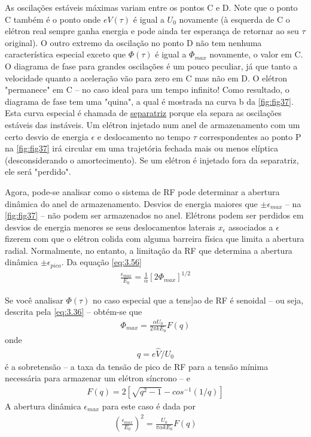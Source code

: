 As oscilações estáveis máximas variam entre os pontos C e D. Note que o ponto C também é o ponto onde $eV(\tau)$ é igual a $U_0$ novamente (à esquerda de C o elétron real sempre ganha energia e pode ainda ter esperança de retornar ao seu $\tau$ original). O outro extremo da oscilação no ponto D não tem nenhuma característica especial exceto que $\Phi(\tau)$ é igual a $\Phi_{max}$ novamente, o valor em C. O diagrama de fase para grandes oscilações é um pouco peculiar, já que tanto a velocidade quanto a aceleração vão para zero em C mas não em D. O elétron "permanece" em C -- no caso ideal para um tempo infinito! Como resultado, o diagrama de fase tem uma "quina", a qual é mostrada na curva b da \autoref{fig:fig37}. Esta curva especial é chamada de \uline{separatriz} porque ela separa as oscilações estáveis das instáveis. Um elétron injetado num anel de armazenamento com um certo desvio de energia $\epsilon$ e deslocamento no tempo $\tau$ correspondentes ao ponto P na \autoref{fig:fig37} irá circular em uma trajetória fechada mais ou menos elíptica (desconsiderando o amortecimento). Se um elétron é injetado fora da separatriz, ele será "perdido".

Agora, pode-se analisar como o sistema de RF pode determinar a abertura dinâmica do anel de armazenamento. Desvios de energia maiores que $\pm \epsilon_{max}$ -- na \autoref{fig:fig37} -- não podem ser armazenados no anel. Elétrons podem ser perdidos em desvios de energia menores se seus deslocamentos laterais $x_\epsilon$ associados a $\epsilon$ fizerem com que o elétron colida com alguma barreira física que limita a abertura radial. Normalmente, no entanto, a limitação da RF que determina a abertura dinâmica $\pm \epsilon_{pico}$. Da equação \eqref{eq:3.56}
\begin{align}
	\frac{\epsilon_{max}}{E_0} = \frac{1}{\alpha}[2\Phi_{max}]^{1/2}
\end{align}

Se você analisar $\Phi(\tau)$ no caso especial que a tens]ao de RF é senoidal -- ou seja, descrita pela \eqref{eq:3.36} -- obtém-se que
\begin{align}
	\Phi_{max} = \frac{\alpha U_0}{2\pi k E_0} F(q)
\end{align}
onde
\begin{align}
	q = e\widehat{V}/U_0
\end{align}
é a sobretensão -- a taxa da tensão de pico de RF para a tensão mínima necessária para armazenar um elétron síncrono -- e
\begin{align}
	F(q) = 2\left[\sqrt{q^2 - 1} - cos^{-1}(1/q)\right]
\end{align}
A abertura dinâmica $\epsilon_{max}$ para este caso é dada por
\begin{align}
	\left(\frac{\epsilon_{max}}{E_0}\right)^2 = \frac{U_0}{\pi \alpha k E_0} F(q)
\end{align}

